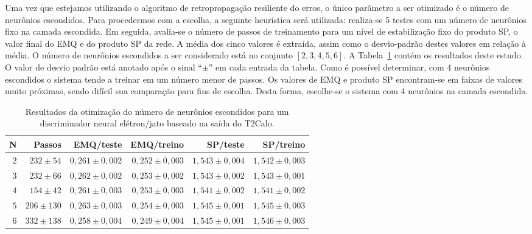 Uma vez que estejamos utilizando o algoritmo de retropropagação resiliente do
erros, o único parâmetro a ser otimizado é o número de neurônios
escondidos. Para procedermos com a escolha, a seguinte heurística será
utilizada: realiza-se 5 testes com um número de neurônios fixo na camada
escondida. Em seguida, avalia-se o número de passos de treinamento para um
nível de estabilização fixo do produto SP, o valor final do EMQ e do produto
SP da rede. A média dos cinco valores é extraída, assim como o desvio-padrão
destes valores em relação à média. O número de neurônios escondidos a ser
considerado está no conjunto $[2, 3, 4, 5, 6]$. A
Tabela~\ref{tab:t2calo-neural-hidden-scan} contém os resultados deste
estudo. O valor de desvio padrão está anotado após o sinal ``$\pm$'' em cada
entrada da tabela. Como é possível determinar, com 4 neurônios escondidos o
sistema tende a treinar em um número menor de passos. Os valores de EMQ e
produto SP encontram-se em faixas de valores muito próximas, sendo difícil sua
comparação para fins de escolha. Desta forma, escolhe-se o sistema com 4
neurônios na camada escondida.

\begin{table}
\caption{Resultados da otimização do número de neurônios escondidos para um
discriminador neural elétron/jato baseado na saída do T2Calo.}
\label{tab:t2calo-neural-hidden-scan}
\begin{center}
\begin{tabular}{|r|r|r|r|r|r|} \hline
N & Passos & EMQ/teste & EMQ/treino & SP/teste & SP/treino \\
\hline 
$2$ & $232\pm54$ & $0,261\pm0,002$ & $0,252\pm0,003$ & $1,543\pm0,004$ & $1,542\pm0,003$ \\
$3$ & $232\pm66$ & $0,262\pm0,002$ & $0,253\pm0,002$ & $1,543\pm0,002$ & $1,543\pm0,001$ \\
$4$ & $154\pm42$ & $0,261\pm0,003$ & $0,253\pm0,003$ & $1,541\pm0,002$ & $1,541\pm0,002$ \\
$5$ & $206\pm130$ & $0,263\pm0,003$ & $0,254\pm0,003$ & $1,545\pm0,001$ & $1,545\pm0,003$ \\
$6$ & $332\pm138$ & $0,258\pm0,004$ & $0,249\pm0,004$ & $1,545\pm0,001$ & $1,546\pm0,003$ \\
\hline
\end{tabular}
\end{center}
\end{table}

